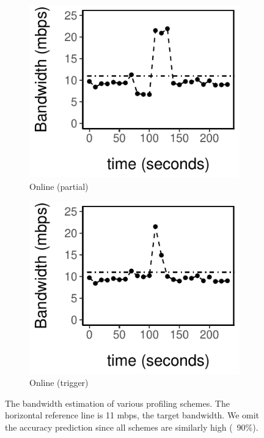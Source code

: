 \begin{figure}
  \\
  \vspace{1.5em}
  \begin{subfigure}[t]{0.48\columnwidth}
    \includegraphics[width=\textwidth]{figures/online3.pdf}
    \caption{Online (partial)}
    \label{fig:online-partial}
  \end{subfigure}
  \hfill
  \begin{subfigure}[t]{0.48\columnwidth}
    \includegraphics[width=\textwidth]{figures/online4.pdf}
    \caption{Online (trigger)}
    \label{fig:online-trigger}
  \end{subfigure}
  \caption{The bandwidth estimation of various profiling schemes. The horizontal
    reference line is 11 mbps, the target bandwidth. We omit the accuracy
    prediction since all schemes are similarly high (~90\%).}
  \label{fig:online-tricks}
\end{figure}

